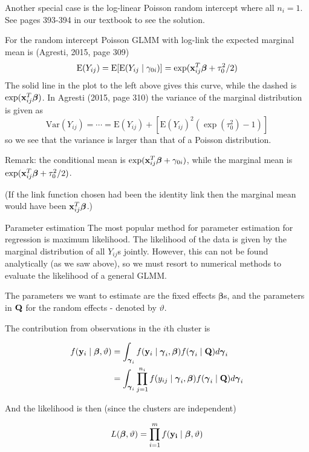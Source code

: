 \documentclass[
  ignorenonframetext,
]{beamer}
\begin{document}
\begin{frame}
Another special case is the log-linear Poisson random intercept where
all \(n_i=1\). See pages 393-394 in our textbook to see the solution.

For the random intercept Poisson GLMM with log-link the expected
marginal mean is (Agresti, 2015, page 309)
\[ \text{E}(Y_{ij})=\text{E}[\text{E}(Y_{ij}\mid \gamma_{0i})]=\exp({\bf x}_{ij}^T{\boldsymbol \beta}+\tau_0^2/2)\]
The solid line in the plot to the left above gives this curve, while the
dashed is \(\exp({\bf x}_{ij}^T{\boldsymbol \beta})\). In Agresti (2015,
page 310) the variance of the marginal distribution is given as
\[\text{Var}(Y_{ij})=\cdots = \text{E}(Y_{ij})+[\text{E}(Y_{ij})^2(\exp(\tau_0^2)-1)]\]
so we see that the variance is larger than that of a Poisson
distribution.

Remark: the conditional mean is
\(\exp({\bf x}_{ij}^T{\boldsymbol \beta}+\gamma_{0i})\), while the
marginal mean is \(\exp({\bf x}_{ij}^T{\boldsymbol \beta}+\tau_0^2/2)\).

(If the link function chosen had been the identity link then the
marginal mean would have been \({\bf x}_{ij}^T{\boldsymbol \beta}\).)
\end{frame}

\begin{frame}{Parameter estimation}
\protect{}\label{parameter-estimation}
The most popular method for parameter estimation for regression is
maximum likelihood. The likelihood of the data is given by the marginal
distribution of all \(Y_{ij}\)s jointly. However, this can not be found
analytically (as we saw above), so we must resort to numerical methods
to evaluate the likelihood of a general GLMM.

The parameters we want to estimate are the fixed effects
\({\boldsymbol \beta}\)s, and the parameters in \({\bf Q}\) for the
random effects - denoted by \(\vartheta\).
\end{frame}

\begin{frame}
The contribution from observations in the \(i\)th cluster is

\[
\begin{aligned}
f({\bf y}_i\mid {\boldsymbol \beta},\vartheta) &= \int_{ {\boldsymbol \gamma}_i} f({\bf y}_i \mid {\boldsymbol \gamma}_i,{\boldsymbol \beta}) f({\boldsymbol \gamma}_i \mid {\bf Q}) d{\boldsymbol \gamma}_i
\\
&=\int_{ {\boldsymbol \gamma}_i} \prod_{j=1}^{n_i}f(y_{ij} \mid {\boldsymbol \gamma}_i,{\boldsymbol \beta}) f({\boldsymbol \gamma}_i \mid {\bf Q}) d{\boldsymbol \gamma}_i
\end{aligned}
\]

And the likelihood is then (since the clusters are independent)

\[
L({\boldsymbol \beta},\vartheta)=\prod_{i=1}^m f(\bf{y}_i\mid {{\boldsymbol \beta}}, \vartheta)
\]
\end{frame}
\end{document}
